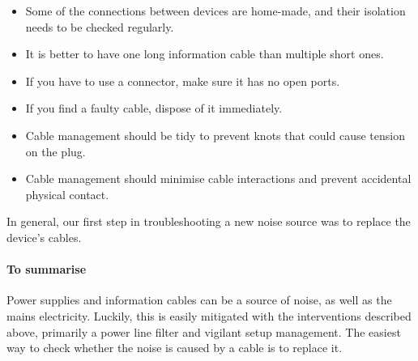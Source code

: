             \begin{itemize}
                \item Some of the connections between devices are home-made, and their isolation needs to be checked regularly. 
                \item It is better to have one long information cable than multiple short ones.
                \item If you have to use a connector, make sure it has no open ports. 
                \item If you find a faulty cable, dispose of it immediately. 
                \item Cable management should be tidy to prevent knots that could cause tension on the plug. 
                \item Cable management should minimise cable interactions and prevent accidental physical contact. 
            \end{itemize} 
        In general, our first step in troubleshooting a new noise source was to replace the device's cables. 
        
        \paragraph{To summarise}
        Power supplies and information cables can be a source of noise, as well as the mains electricity. Luckily, this is easily mitigated with the interventions described above, primarily a power line filter and vigilant setup management. The easiest way to check whether the noise is caused by a cable is to replace it. 
        
